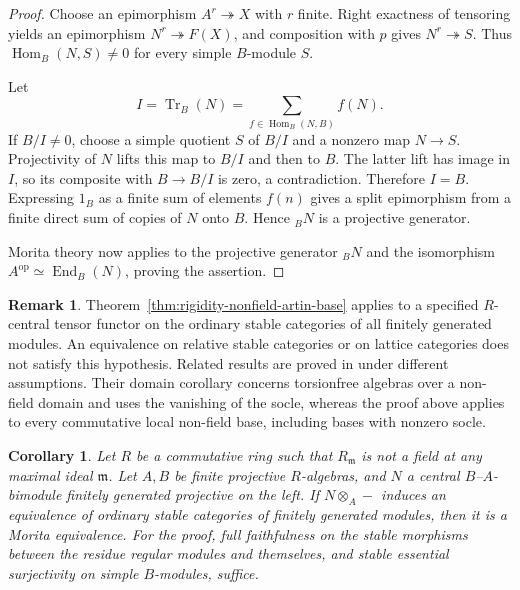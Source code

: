 \documentclass[12pt,a4paper,english,reqno]{amsart}
\numberwithin{equation}{section}
\theoremstyle{plain}
\newtheorem{corollary}[theorem]{Corollary}
\theoremstyle{definition}
\newtheorem{remark}[theorem]{Remark}
\begin{document}
\begin{proof}
Choose an epimorphism $A^r\twoheadrightarrow X$ with $r$ finite.
Right exactness of tensoring yields an epimorphism
$N^r\twoheadrightarrow F(X)$, and composition with $p$ gives
$N^r\twoheadrightarrow S$.  Thus
$\operatorname{Hom}_B(N,S)\ne0$ for every simple $B$-module $S$.

Let
\[
 I=\operatorname{Tr}_B(N)
   =\sum_{f\in\operatorname{Hom}_B(N,B)}f(N).
\]
If $B/I\ne0$, choose a simple quotient $S$ of $B/I$ and a nonzero
map $N\to S$.  Projectivity of $N$ lifts this map to $B/I$ and
then to $B$.  The latter lift has image in $I$, so its composite
with $B\to B/I$ is zero, a contradiction.  Therefore $I=B$.
Expressing $1_B$ as a finite sum of elements $f(n)$ gives a split
epimorphism from a finite direct sum of copies of $N$ onto $B$.
Hence ${}_BN$ is a projective generator.

Morita theory now applies to the projective generator ${}_BN$ and
the isomorphism
$A^{\mathrm{op}}\simeq\operatorname{End}_B(N)$, proving the assertion.
\end{proof}

\begin{remark}
Theorem~\ref{thm:rigidity-nonfield-artin-base} applies to a specified
$R$-central tensor functor on the ordinary stable categories of all
finitely generated modules.  An equivalence on relative stable
categories or on lattice categories does not satisfy this hypothesis.
Related results are proved in
\cite[Theorem~8.8 and Corollary~8.9]{DugasMartinezVilla2008} under
different assumptions.  Their domain corollary concerns torsionfree
algebras over a non-field domain and uses the vanishing of the socle,
whereas the proof above applies to every commutative local
non-field base, including bases with nonzero socle.
\end{remark}

\begin{corollary}\label{cor:rigidity-global}
Let $R$ be a commutative ring such that $R_{\mathfrak m}$ is not
a field at any maximal ideal $\mathfrak m$. Let $A,B$ be finite
projective $R$-algebras, and $N$ a central $B$--$A$-bimodule
finitely generated projective on the left. If $N\otimes_A-$
induces an equivalence of ordinary stable categories of
finitely generated modules, then it is a Morita equivalence.
For the proof, full faithfulness on the stable morphisms
between the residue regular modules and themselves, and stable
essential surjectivity on simple $B$-modules, suffice.
\end{corollary}
\end{document}
